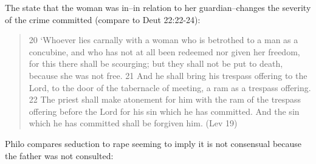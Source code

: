 \documentclass[11pt]{article}
\begin{document}
The state that the woman was in--in relation to her guardian--changes the severity of the crime committed (compare to Deut 22:22-24):
\begin{quote}
20 ‘Whoever lies carnally with a woman who is betrothed to a man as a concubine, and who has not at all been redeemed nor given her freedom, for this there shall be scourging; but they shall not be put to death, because she was not free. 21 And he shall bring his trespass offering to the Lord, to the door of the tabernacle of meeting, a ram as a trespass offering. 22 The priest shall make atonement for him with the ram of the trespass offering before the Lord for his sin which he has committed. And the sin which he has committed shall be forgiven him. (Lev 19)
\end{quote}

Philo compares seduction to rape seeming to imply it is not consensual because the father was not consulted:
\end{document}

